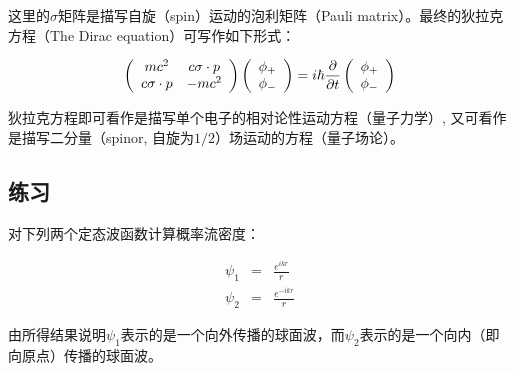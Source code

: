 这里的$\sigma$矩阵是描写自旋（spin）运动的泡利矩阵（Pauli
matrix）。最终的狄拉克方程（The Dirac equation）可写作如下形式：


\begin{equation}\label{diracequation}
    \left( {\begin{array}{*{20}c}
   {mc^2 } & {c\sigma  \cdot p}  \\
   {c\sigma  \cdot p} & { - mc^2 }  \\
\end{array}} \right)\left( {\begin{array}{*{20}c}
   {\phi _ +  }  \\
   {\phi _ -  }  \\
\end{array}} \right) = i\hbar \frac{\partial }{{\partial t}}\left( {\begin{array}{*{20}c}
   {\phi _ +  }  \\
   {\phi _ -  }  \\
\end{array}} \right)
\end{equation}


狄拉克方程即可看作是描写单个电子的相对论性运动方程（量子力学）,
又可看作是描写二分量（spinor, 自旋为$1/2$）场运动的方程（量子场论）。


\subsection*{练习}

对下列两个定态波函数计算概率流密度：

\begin{eqnarray}
\psi_1 &=& \frac{e^{i k r}}{r} \\
\psi_2 &=& \frac{e^{ - i k r}}{r}
\end{eqnarray}

由所得结果说明$\psi_1$表示的是一个向外传播的球面波，而$\psi_2$表示的是一个向内（即向原点）传播的球面波。


